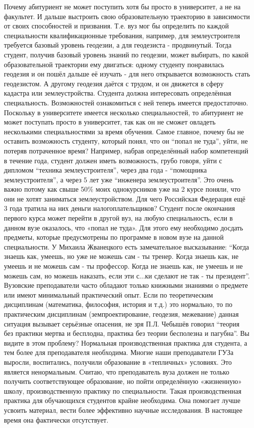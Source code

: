 \begin{drama}
	\maxspeaks Почему абитуриент не может поступить хотя бы просто в университет, а не на факультет. И дальше выстроить свою образовательную траекторию в зависимости от своих способностей и призвания. Т.е. вуз мог бы определить по каждой специальности квалификационные требования, например, для землеустроителя требуется базовый уровень геодезии, а для геодезиста - продвинутый.  Тогда студент, получив базовый уровень знаний по геодезии, может выбирать, по какой образовательной траектории ему двигаться: одному студенту понравилась геодезия и он пошёл дальше её изучать - для него открывается возможность стать геодезистом. А другому геодезия даётся с трудом, и он движется в сферу кадастра или землеустройства. 
	\michaelspeaks Студента должна интересовать определённая специальность. Возможностей ознакомиться с ней теперь имеется предостаточно. Поскольку в университете имеется несколько специальностей, то абитуриент не может поступать просто в университет, так как он не сможет овладеть несколькими специальностями за время обучения.
	\maxspeaks Самое главное, почему бы не оставить возможность студенту, который понял, что он “попал не туда”, уйти, не потеряв потраченное время? Например, набрав определённый набор компетенций в течение года, студент должен иметь возможность, грубо говоря, уйти с дипломом “техника землеустроителя”, через два года - “помощника землеустроителя”, а через 5 лет уже “инженера землеустроителя”. Это очень важно потому как свыше 50\% моих однокурсников уже на 2 курсе поняли, что они не хотят заниматься землеустройством. Для чего Российская Федерация ещё 3 года тратила на них деньги налогоплательщиков?
	\michaelspeaks Студент после окончания первого курса может перейти в другой вуз, на любую специальность, если в данном вузе оказалось, что «попал не туда». Для этого ему необходимо досдать предметы, которые предусмотрены по программе в новом вузе на данной специальности.
	\maxspeaks У Михаила Жванецкого есть замечательное высказывание: “Когда знаешь как, умеешь, но уже не можешь сам - ты тренер. Когда знаешь как, не умеешь и не можешь сам - ты профессор. Когда не знаешь как, не умеешь и не можешь сам, но можешь наказать, если эти с...ки сделают не так - ты президент”. Вузовские преподаватели часто обладают только книжными знаниями о предмете или имеют минимальный практический опыт. Если по теоретическим дисциплинам (математика, философия, история и т.д.) это нормально, то по практическим дисциплинам (земпроектирование, геодезия, межевание) данная ситуация вызывает серьёзные опасения, не зря П.Л. Чебышёв говорил “теория без практики мертва и бесплодна, практика без теории бесполезна и пагубна”. Вы видите в этом проблему?
	\michaelspeaks Нормальная производственная практика для студента, а тем более для преподавателя необходима. Многие наши преподаватели ГУЗа выросли, воспитались, получили образование в «тепличных» условиях. Это является ненормальным. Считаю, что преподаватель вуза должен не только получить соответствующее образование, но пойти определённую «жизненную» школу, производственную практику по специальности. Такая производственная практика для обучающихся студентов крайне необходима. Она помогает лучше усвоить материал, вести более эффективно научные исследования. В настоящее время она фактически отсутствует.
	

\end{drama}

